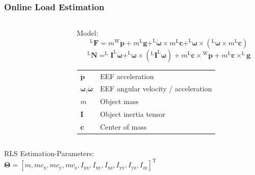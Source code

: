\documentclass[student,noshadow]{ITRslides}
\renewcommand{\vec}[1]{\boldsymbol{#1}}
\renewcommand{\vec}[1]{\boldsymbol{#1}}
\newcommand{\scr}[1]{\mathrm{#1}}
\begin{document}
\begin{frame}
	\frametitle{Online Load Estimation}
	
	\begin{columns}
		\centering
		\begin{column}{0.25\textwidth}
			\begin{figure}
				\centering
				
			\end{figure}
		\end{column}
				 		
		\begin{column}{0.75\textwidth}
			Model:\\ \cite{literaturstelle2}
			\[^\scr{L}\vec{F} = m {^\scr{W}}\vec{\ddot{p}} + m ^\scr{L}\vec{g} + ^\scr{L}\vec{\dot{\omega}} \times m ^\scr{L}\vec{c} + ^\scr{L}\vec{\omega} \times (^\scr{L}\vec{\omega} \times m ^\scr{L}\vec{c})\]
			\[^\scr{L}\vec{N} = ^\scr{L}\vec{I} ^\scr{L}\vec{\dot{\omega}} + ^\scr{L}\vec{\omega} \times (^\scr{L}\vec{I} ^\scr{L}\vec{\omega}) + m ^\scr{L}\vec{c} \times {^\scr{W}}\vec{\ddot{p}} + m ^\scr{L}\vec{c} \times ^\scr{L}\vec{g}\]
						
			\vspace{0.2cm}
			\begin{tabular}{ll}
				\toprule
				$\vec{\ddot{p}}$       &  EEF acceleration \\
				$\vec{\omega}$,$\vec{\dot{\omega}}$ & EEF angular velocity / acceleration \\
				\color{red}$m$                                        & Object mass \\
				\color{red}$\vec{I}$                        & Object inertia tensor \\
				\color{red}$\vec{c}$                             &  Center of mass   \\               
				\bottomrule
			\end{tabular}
		\end{column}
	\end{columns}
	\vspace{0.35cm}
	RLS Estimation-Parameters: \\
	$\vec{\Theta} = [m, m c_\scr{x}, m c_\scr{y}, m c_\scr{z}, I_\scr{xx}, I_\scr{xy}, I_\scr{xz}, I_\scr{yy},I_\scr{yz}, I_\scr{zz}]^\scr{T}$ \\
\end{frame}
\end{document}
